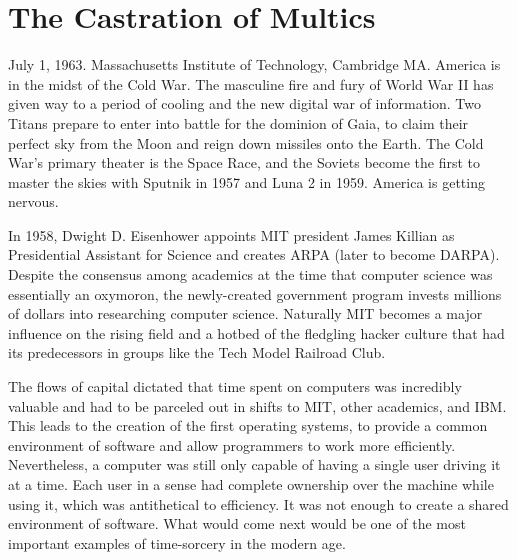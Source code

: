 \documentclass[12pt, a5paper, twoside, openright]{memoir}
\begin{document}
\newbox\adjust

\begin{titlingpage}

\vfill

\end{titlingpage}

\frontmatter
\pagestyle{simple}

\tableofcontents*

\mainmatter

\chapter{The Castration of Multics}

July 1, 1963. Massachusetts Institute of Technology, Cambridge MA. America is in the midst of the Cold War. The masculine fire and fury of World War II has given way to a period of cooling and the new digital war of information. Two Titans prepare to enter into battle for the dominion of Gaia, to claim their perfect sky from the Moon and reign down missiles onto the Earth. The Cold War's primary theater is the Space Race, and the Soviets become the first to master the skies with Sputnik in 1957 and Luna 2 in 1959. America is getting nervous.

In 1958, Dwight D. Eisenhower appoints MIT president James Killian as Presidential Assistant for Science and creates ARPA (later to become DARPA). Despite the consensus among academics at the time that computer science was essentially an oxymoron, the newly-created government program invests millions of dollars into researching computer science. Naturally MIT becomes a major influence on the rising field and a hotbed of the fledgling hacker culture that had its predecessors in groups like the Tech Model Railroad Club.

The flows of capital dictated that time spent on computers was incredibly valuable and had to be parceled out in shifts to MIT, other academics, and IBM. This leads to the creation of the first operating systems, to provide a common environment of software and allow programmers to work more efficiently. Nevertheless, a computer was still only capable of having a single user driving it at a time. Each user in a sense had complete ownership over the machine while using it, which was antithetical to efficiency. It was not enough to create a shared environment of software. What would come next would be one of the most important examples of time-sorcery in the modern age.
\end{document}
